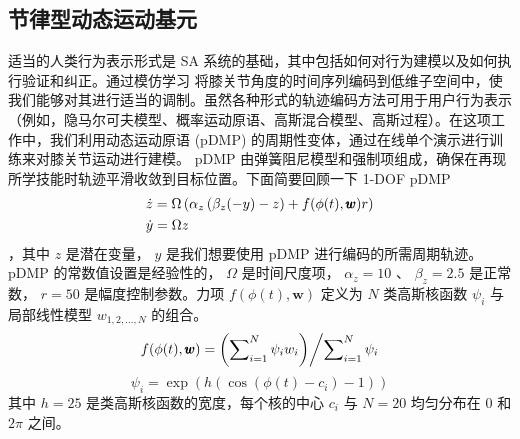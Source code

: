 
\subsection{节律型动态运动基元} 适当的人类行为表示形式是 SA 系统的基础，其中包括如何对行为建模以及如何执行验证和纠正。通过模仿学习    \cite{schaalImitationLearningRoute1999}    将膝关节角度的时间序列编码到低维子空间中，使我们能够对其进行适当的调制。虽然各种形式的轨迹编码方法可用于用户行为表示（例如，隐马尔可夫模型、概率运动原语、高斯混合模型、高斯过程）。在这项工作中，我们利用动态运动原语 (pDMP)    \cite{ijspeertDynamicalMovementPrimitives2013,gamsOnlineLearningModulation2009}    的周期性变体，通过在线单个演示进行训练来对膝关节运动进行建模。 pDMP 由弹簧阻尼模型和强制项组成，确保在再现所学技能时轨迹平滑收敛到目标位置。下面简要回顾一下 1-DOF pDMP
    \begin{equation}
  \label{deqn_ex8}
  \begin{gathered}
  \dot z = \Omega \left( {{\alpha _z}\left( {{\beta _z}( - y) - z} \right) + f(\phi (t),\pmb{w})r} \right) \hfill  \\ 
  \dot y = \Omega z \hfill  \\  
  \end{gathered} 
\end{equation}   ，其中    $z$    是潜在变量，   $y$    是我们想要使用 pDMP 进行编码的所需周期轨迹。 pDMP 的常数值设置是经验性的，   $\Omega $    是时间尺度项，   ${\alpha _z} = 10$    、    ${\beta _z} = 2.5$    是正常数，   $r = 50$    是幅度控制参数。力项    $f(\phi (t),\pmb{w})$    定义为    $N$    类高斯核函数    ${\psi _i}$    与局部线性模型    ${w_{1,2,...,N}}$    的组合。
    \begin{equation}
  \label{deqn_ex9}
  f(\phi (t),\pmb{w}) = {{\left( {\sum\nolimits_{i = 1}^N {{\psi _i}{w_i}} } \right)} \mathord{\left/
 {\vphantom {{\left( {\sum\nolimits_{i = 1}^N {{\psi _i}{w_i}} } \right)} {\sum\nolimits_{i = 1}^N {{\psi _i}} }}} \right.
 \kern-\nulldelimiterspace} {\sum\nolimits_{i = 1}^N {{\psi _i}} }}
\end{equation}   
    \begin{equation}
  \label{deqn_ex10}
  {\psi _i} = \exp (h(\cos (\phi (t) - {c_i}) - 1))
\end{equation}    其中    $h = 25$    是类高斯核函数的宽度，每个核的中心    ${c_i}$    与    $N = 20$    均匀分布在 0 和    $2\pi $    之间。
